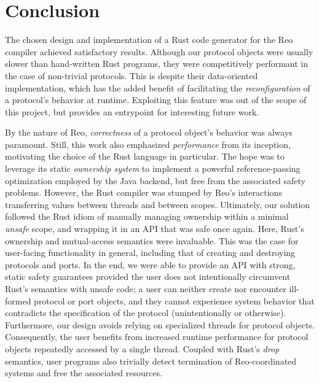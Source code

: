 \section{Conclusion}

The chosen design and implementation of a Rust code generator for the Reo compiler achieved satisfactory results. Although our protocol objects were usually slower than hand-written Rust programs, they were competitively performant in the case of non-trivial protocols. This is despite their data-oriented implementation, which has the added benefit of facilitating the \textit{reconfiguration} of a protocol's behavior at runtime. Exploiting this feature was out of the scope of this project, but provides an entrypoint for interesting future work.

By the nature of Reo, \textit{correctness} of a protocol object's behavior was always paramount. Still, this work also emphasized \textit{performance} from its inception, motivating the choice of the Rust language in particular. The hope was to leverage its static \textit{ownership system} to implement a powerful reference-passing optimization employed by the Java backend, but free from the associated safety problems. However, the Rust compiler was stumped by Reo's interactions transferring values between threads and between scopes. Ultimately, our solution followed the Rust idiom of manually managing ownership within a minimal \textit{unsafe} scope, and wrapping it in an API that was safe once again. Here, Rust's ownership and mutual-access semantics were invaluable. This was the case for user-facing functionality in general, including that of creating and destroying protocols and ports. In the end, we were able to provide an API with strong, static safety guarantees provided the user does not intentionally circumvent Rust's semantics with unsafe code; a user can neither create nor encounter ill-formed protocol or port objects, and they cannot experience system behavior that contradicts the specification of the protocol (unintentionally or otherwise). Furthermore, our design avoids relying on specialized threads for protocol objects. Consequently, the user benefits from increased runtime performance for protocol objects repeatedly accessed by a single thread. Coupled with Rust's \textit{drop} semantics, user programs also trivially detect termination of Reo-coordinated systems and free the associated resources.

